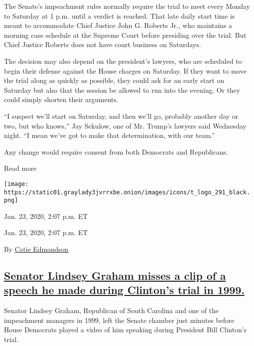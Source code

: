 The Senate's impeachment rules normally require the trial to meet every
Monday to Saturday at 1 p.m. until a verdict is reached. That late daily
start time is meant to accommodate Chief Justice John G. Roberts Jr.,
who maintains a morning case schedule at the Supreme Court before
presiding over the trial. But Chief Justice Roberts does not have court
business on Saturdays.

The decision may also depend on the president's lawyers, who are
scheduled to begin their defense against the House charges on Saturday.
If they want to move the trial along as quickly as possible, they could
ask for an early start on Saturday but also that the session be allowed
to run into the evening. Or they could simply shorten their arguments.

``I suspect we'll start on Saturday, and then we'll go, probably another
day or two, but who knows,'' Jay Sekulow, one of Mr. Trump's lawyers
said Wednesday night. ``I mean we've got to make that determination,
with our team.''

Any change would require consent from both Democrats and Republicans.

Read more

\texttt{[image: https://static01.graylady3jvrrxbe.onion/images/icons/t\_logo\_291\_black.png]}

Jan. 23, 2020, 2:07 p.m. ET

Jan. 23, 2020, 2:07 p.m. ET

By \href{https://www.nytimes3xbfgragh.onion/by/catie-edmondson}{Catie
Edmondson}

\hypertarget{senator-lindsey-graham-misses-a-clip-of-a-speech-he-made-during-clintons-trial-in-1999}{%
\subsection{\texorpdfstring{\protect\hyperlink{senator-lindsey-graham-misses-a-clip-of-a-speech-he-made-during-clintons-trial-in-1999}{Senator
Lindsey Graham misses a clip of a speech he made during Clinton's trial
in
1999.}}{Senator Lindsey Graham misses a clip of a speech he made during Clinton's trial in 1999.}}\label{senator-lindsey-graham-misses-a-clip-of-a-speech-he-made-during-clintons-trial-in-1999}}

Senator Lindsey Graham, Republican of South Carolina and one of the
impeachment managers in 1999, left the Senate chamber just minutes
before House Democrats played a video of him speaking during President
Bill Clinton's trial.


